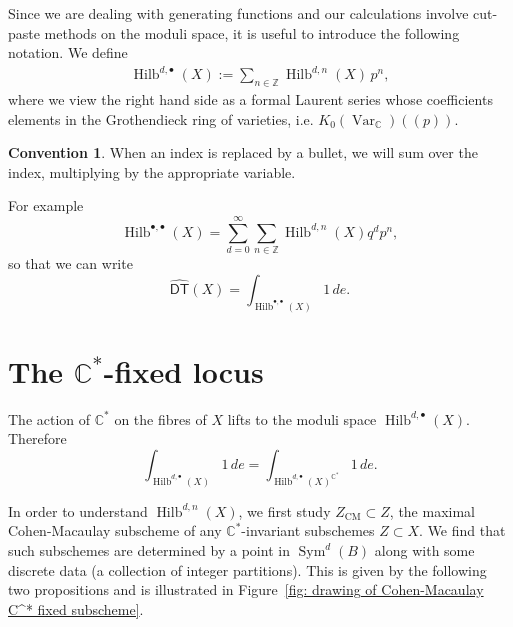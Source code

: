 \documentclass{amsart}
\theoremstyle{definition}
\newtheorem{convention}[theorem]{Convention}
\newcommand{\CC} {\mathbb{C}}          %
\newcommand{\ZZ} {\mathbb{Z}}		%
\newcommand{\Sym}{\operatorname{Sym}}
\newcommand{\Hilb}{\operatorname{Hilb}}
\newcommand{\DT}{\mathsf{DT}}
\newcommand{\CM}{\operatorname{CM}}
\newcommand{\Var}{\operatorname{Var}}
\newcommand{\DThat}{\widehat{\DT}}
\begin{document}
Since we are dealing with generating functions and our calculations
involve cut-paste methods on the moduli space, it is useful to
introduce the following notation. We define
\begin{align*}
\Hilb^{d,\bullet}(X) := \sum_{n \in \ZZ} \Hilb^{d,n}(X) \, p^n,
\end{align*}
where we view the right hand side as a formal Laurent series whose
coefficients elements in the Grothendieck ring of varieties,
i.e. $K_0(\Var_{\CC})(\!(p)\!)$.



\begin{convention}\label{conv: bullet convention}
When an index is replaced by a bullet, we will sum over the index,
multiplying by the appropriate variable. 
\end{convention}

For example
\[
\Hilb^{\bullet ,\bullet}(X) = \sum_{d=0}^{\infty}\sum_{n\in \ZZ}
\Hilb^{d,n}(X) q^{d}p^{n},
\]
so that we can write
\[
\DThat (X) = \int_{\Hilb^{\bullet ,\bullet}(X)} 1\, de .
\]


\section{The $\CC^*$-fixed locus} \label{fixedlocus}

The action of $\CC^*$ on the fibres of $X$ lifts to the moduli space
$\Hilb^{d,\bullet}(X)$. Therefore
$$
\int_{\Hilb^{d,\bullet}(X)} 1 \, de = \int_{\Hilb^{d,\bullet}(X)^{\CC^*}} 1 \, de.
$$

In order to understand $\Hilb^{d,n}(X)$, we first study
$Z_{\CM}\subset Z$, the maximal Cohen-Macaulay subscheme of any
$\CC^{*}$-invariant subschemes $Z\subset X$. We find that such
subschemes are determined by a point in $\Sym^{d}(B)$ along with some
discrete data (a collection of integer partitions). This is given by
the following two propositions and is illustrated in Figure~\ref{fig:
drawing of Cohen-Macaulay C^* fixed subscheme}.
\end{document}
